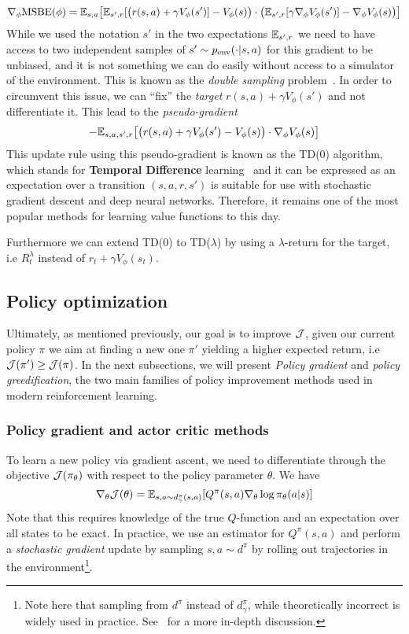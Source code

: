 $$\nabla_\phi \text{MSBE}(\phi) = \mathbb{E}_{s, a} \big[ \mathbb{E}_{s', r}[ \big( r(s,a) + \gamma V_\phi(s')] - V_\phi(s) \big) \cdot \big(\mathbb{E}_{s', r}[ \gamma \nabla_\phi V_\phi(s')] - \nabla_\phi V_\phi(s) \big)\big]$$
While we used the notation $s'$ in the two expectations $\mathbb{E}_{s', r}$ we need to have access to two independent samples of $s' \sim p_{\text{env}}(\cdot |s,a)$ for this gradient to be unbiased, and it is not something we can do easily without access to a simulator of the environment. This is known as the \emph{double sampling} problem~\citep{baird1995residual}. In order to circumvent this issue, we can ``fix'' the \emph{target} $r(s,a) + \gamma V_\phi(s')$ and not differentiate it.
This lead to the \emph{pseudo-gradient}
$$ - \mathbb{E}_{s, a, s', r} \big[\big( r(s,a) + \gamma V_\phi(s') - V_\phi(s) \big) \cdot \nabla_\phi V_\phi(s)\big]$$
This update rule using this pseudo-gradient is known as the TD(0) algorithm, which stands for \textbf{Temporal Difference} learning~\citep{sutton1988learning} and it can be expressed as an expectation over a transition $(s, a, r, s')$
 is suitable for use with stochastic gradient descent and deep neural networks. Therefore, it remains one of the most popular methods for learning value functions to this day.

Furthermore we can extend TD(0) to TD($\lambda$) by using a $\lambda$-return for the target, i.e $R^\lambda_t$ instead of $r_t + \gamma V_\phi(s_t)$.

\subsection{Policy optimization}

Ultimately, as mentioned previously, our goal is to improve ${\mathcal{J}}$, given our current policy $\pi$ we aim at finding a new one $\pi'$ yielding a higher expected return, i.e ${\mathcal{J}}(\pi') \ge {\mathcal{J}}(\pi)$. In the next subsections, we will present \emph{Policy gradient} and \emph{policy greedification}, the two main families of policy improvement methods used in modern reinforcement learning.

\subsubsection{Policy gradient and actor critic methods}
To learn a new policy via gradient ascent, we need to differentiate through the objective ${\mathcal{J}}(\pi_\theta)$ with respect to the policy parameter $\theta$.
We have~\citep{williams1992simple, sutton1999policy}
\begin{equation}
    \label{eq:policy_gradient}
    \nabla_\theta {\mathcal{J}}(\theta) = \mathbb{E}_{s, a \sim d^\pi_\gamma(s,a)} [ Q^\pi(s,a) \nabla_\theta \log \pi_\theta(a|s)]
\end{equation}
Note that this requires knowledge of the true $Q$-function and an expectation over all states to be exact. In practice, we use an estimator for $Q^\pi(s,a)$ and perform a \emph{stochastic gradient} update by sampling $s,a \sim d^\pi$ by rolling out trajectories in the environment\footnote{Note here that sampling from $d^\pi$ instead of $d^\pi_\gamma$, while theoretically incorrect is widely used in practice. See~\citep{nota2019policy} for a more in-depth discussion.}.

